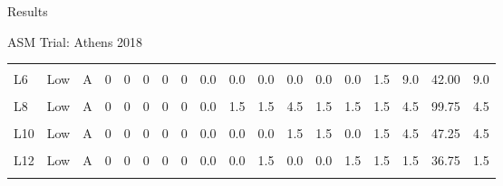 \documentclass[
  ignorenonframetext,
]{beamer}
\begin{document}
\begin{frame}{Results}
\begin{block}{ASM Trial: Athens 2018}
\begin{table}
{\begin{tabular}[t]{lllrrrrrrrrrrrrrrr}
\cellcolor{gray!6}{L5} & \cellcolor{gray!6}{Low} & \cellcolor{gray!6}{S} & \cellcolor{gray!6}{0} & \cellcolor{gray!6}{0} & \cellcolor{gray!6}{0} & \cellcolor{gray!6}{0} & \cellcolor{gray!6}{0} & \cellcolor{gray!6}{0.0} & \cellcolor{gray!6}{0.0} & \cellcolor{gray!6}{1.5} & \cellcolor{gray!6}{0.0} & \cellcolor{gray!6}{1.5} & \cellcolor{gray!6}{0.0} & \cellcolor{gray!6}{0.0} & \cellcolor{gray!6}{17.5} & \cellcolor{gray!6}{82.25} & \cellcolor{gray!6}{17.5}\\
L6 & Low & A & 0 & 0 & 0 & 0 & 0 & 0.0 & 0.0 & 0.0 & 0.0 & 0.0 & 0.0 & 1.5 & 9.0 & 42.00 & 9.0\\
\cellcolor{gray!6}{L7} & \cellcolor{gray!6}{Low} & \cellcolor{gray!6}{S} & \cellcolor{gray!6}{0} & \cellcolor{gray!6}{0} & \cellcolor{gray!6}{0} & \cellcolor{gray!6}{0} & \cellcolor{gray!6}{0} & \cellcolor{gray!6}{1.5} & \cellcolor{gray!6}{1.5} & \cellcolor{gray!6}{1.5} & \cellcolor{gray!6}{0.0} & \cellcolor{gray!6}{0.0} & \cellcolor{gray!6}{1.5} & \cellcolor{gray!6}{1.5} & \cellcolor{gray!6}{17.5} & \cellcolor{gray!6}{113.75} & \cellcolor{gray!6}{17.5}\\
L8 & Low & A & 0 & 0 & 0 & 0 & 0 & 0.0 & 1.5 & 1.5 & 4.5 & 1.5 & 1.5 & 1.5 & 4.5 & 99.75 & 4.5\\
\addlinespace
\cellcolor{gray!6}{L9} & \cellcolor{gray!6}{Low} & \cellcolor{gray!6}{S} & \cellcolor{gray!6}{0} & \cellcolor{gray!6}{0} & \cellcolor{gray!6}{0} & \cellcolor{gray!6}{0} & \cellcolor{gray!6}{0} & \cellcolor{gray!6}{0.0} & \cellcolor{gray!6}{0.0} & \cellcolor{gray!6}{0.0} & \cellcolor{gray!6}{1.5} & \cellcolor{gray!6}{0.0} & \cellcolor{gray!6}{0.0} & \cellcolor{gray!6}{0.0} & \cellcolor{gray!6}{17.5} & \cellcolor{gray!6}{71.75} & \cellcolor{gray!6}{17.5}\\
L10 & Low & A & 0 & 0 & 0 & 0 & 0 & 0.0 & 0.0 & 0.0 & 1.5 & 1.5 & 0.0 & 1.5 & 4.5 & 47.25 & 4.5\\
\cellcolor{gray!6}{L11} & \cellcolor{gray!6}{Low} & \cellcolor{gray!6}{A} & \cellcolor{gray!6}{0} & \cellcolor{gray!6}{0} & \cellcolor{gray!6}{0} & \cellcolor{gray!6}{0} & \cellcolor{gray!6}{0} & \cellcolor{gray!6}{0.0} & \cellcolor{gray!6}{0.0} & \cellcolor{gray!6}{0.0} & \cellcolor{gray!6}{0.0} & \cellcolor{gray!6}{1.5} & \cellcolor{gray!6}{4.5} & \cellcolor{gray!6}{1.5} & \cellcolor{gray!6}{0.0} & \cellcolor{gray!6}{52.50} & \cellcolor{gray!6}{0.0}\\
L12 & Low & A & 0 & 0 & 0 & 0 & 0 & 0.0 & 0.0 & 1.5 & 0.0 & 0.0 & 1.5 & 1.5 & 1.5 & 36.75 & 1.5\\
\cellcolor{gray!6}{H1} & \cellcolor{gray!6}{High} & \cellcolor{gray!6}{S?} & \cellcolor{gray!6}{0} & \cellcolor{gray!6}{0} & \cellcolor{gray!6}{0} & \cellcolor{gray!6}{0} & \cellcolor{gray!6}{0} & \cellcolor{gray!6}{0.0} & \cellcolor{gray!6}{0.0} & \cellcolor{gray!6}{0.0} & \cellcolor{gray!6}{1.5} & \cellcolor{gray!6}{0.0} & \cellcolor{gray!6}{4.5} & \cellcolor{gray!6}{4.5} & \cellcolor{gray!6}{1.5} & \cellcolor{gray!6}{78.75} & \cellcolor{gray!6}{1.5}\\

\end{tabular}}
\end{table}
\end{block}
\end{frame}
\end{document}
